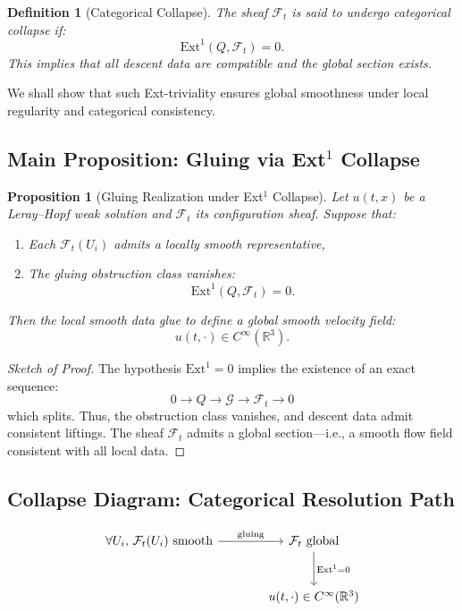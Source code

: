 \documentclass[11pt]{article}
\newtheorem{definition}[theorem]{Definition}
\newtheorem{proposition}[theorem]{Proposition}
\begin{document}
\begin{definition}[Categorical Collapse]
The sheaf \( \mathcal{F}_t \) is said to undergo \emph{categorical collapse} if:
\[
\mathrm{Ext}^1(Q, \mathcal{F}_t) = 0.
\]
This implies that all descent data are compatible and the global section exists.
\end{definition}

We shall show that such Ext-triviality ensures global smoothness under local regularity and categorical consistency.

\subsection{Main Proposition: Gluing via Ext$^1$ Collapse}

\begin{proposition}[Gluing Realization under Ext$^1$ Collapse]
\label{prop:ext-collapse-regularity}
Let \( u(t,x) \) be a Leray–Hopf weak solution and \( \mathcal{F}_t \) its configuration sheaf. Suppose that:
\begin{enumerate}
  \item Each \( \mathcal{F}_t(U_i) \) admits a locally smooth representative,
  \item The gluing obstruction class vanishes:
  \[
  \mathrm{Ext}^1(Q, \mathcal{F}_t) = 0.
  \]
\end{enumerate}
Then the local smooth data glue to define a global smooth velocity field:
\[
u(t, \cdot) \in C^\infty(\mathbb{R}^3).
\]
\end{proposition}

\begin{proof}[Sketch of Proof]
The hypothesis \( \mathrm{Ext}^1 = 0 \) implies the existence of an exact sequence:
\[
0 \to Q \to \mathcal{G} \to \mathcal{F}_t \to 0
\]
which splits. Thus, the obstruction class vanishes, and descent data admit consistent liftings. The sheaf \( \mathcal{F}_t \) admits a global section—i.e., a smooth flow field consistent with all local data.
\end{proof}

\subsection{Collapse Diagram: Categorical Resolution Path}

\[
\begin{tikzcd}[row sep=large, column sep=large]
\forall U_i,\, \mathcal{F}_t(U_i) \text{ smooth}
\arrow[r, "\text{gluing}"]
& \mathcal{F}_t \text{ global} \arrow[d, "\mathrm{Ext}^1 = 0"] \\
& u(t, \cdot) \in C^\infty(\mathbb{R}^3)
\end{tikzcd}
\]
\end{document}
